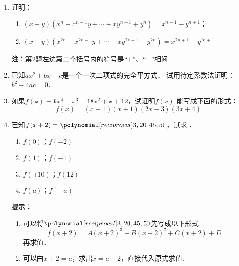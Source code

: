 \begin{enumerate}
\item 证明：
\begin{enumerate}
    \item $(x-y)(x^n+x^{n-1}y+\cdots +xy^{n-1}+y^n)=x^{n+1}-y^{n+1}$；
    \item $(x+y)(x^{2n}-x^{2n-1}y+\cdots -xy^{2n-1}+y^{2n})=x^{2n+1}+y^{2n+1}$
\end{enumerate}
\textbf{注：}第2题左边第二个括号内的符号是“$+$”、“$-$”相间．

\item  已知$ax^2+bx+c$是一个一次二项式的完全平方式．
试用待定系数法证明：$b^2-4ac=0$．
\item  如果$f(x)=6x^4-x^3-18x^2+x+12$，试证明$f(x)$
能写成下面的形式：
\[f(x)=(x-1)(x+1)(2x-3)(3x+4)\]
\item 已知$f(x+2)=\poly{3,20,45,50}$，试求：
    \begin{multicols}{2}
\begin{enumerate}
    \item $f(0)$；$f(-2)$
    \item $f(1)$；$f(-1)$
    \item $f(+10)$；$f(12)$
    \item $f(a)$；$f(-a)$
\end{enumerate}
\end{multicols}
\textbf{提示：}
\begin{enumerate}
    \item 可以将$\poly{3,20,45,50}$先写成以下形式：
    \[f(x+2)=A(x+2)^3+B(x+2)^2+C(x+2)+D\]
    再求值．
    \item 可以由$x+2=a$，求出$x=a-2$，直接代入原式求值．
\end{enumerate}

\end{enumerate}


